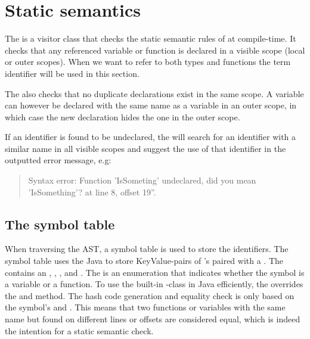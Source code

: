 \section{Static semantics}
The  is a visitor class that checks the static semantic rules of \productname{} at compile-time. It checks that any referenced variable or function is declared in a visible scope (local or outer scopes). When we want to refer to both types and functions the term identifier will be used in this section. 

The  also checks that no duplicate declarations exist in the same scope. A variable can however be declared with the same name as a variable in an outer scope, in which case the new declaration hides the one in the outer scope. 

If an identifier is found to be undeclared, the  will search for an identifier with a similar name in all visible scopes and suggest the use of that identifier in the outputted error message, e.g: 

\begin{quote}
Syntax error: Function 'IsSometing' undeclared, did you mean 'IsSomething'? at line 8, offset 19''.
\end{quote}

\subsection{The symbol table}
When traversing the AST, a symbol table is used to store the identifiers. 
The symbol table uses the Java  to store KeyValue-pairs of  's paired with a . 
The  contains an  ,  ,  , and  . 
The   is an enumeration that indicates whether the symbol is a variable or a function. 
To use the built-in -class in Java efficiently, the  overrides the  and  method. 
The hash code generation and equality check is only based on the symbol's  and . 
This means that two functions or variables with the same name but found on different lines or offsets are considered equal, which is indeed the intention for a static semantic check.

